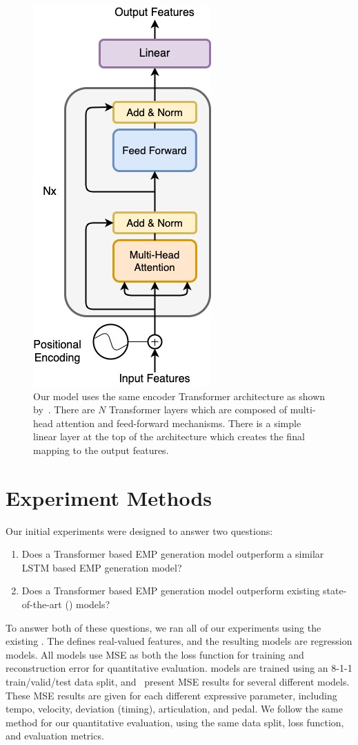 \begin{figure}[h]
    \centering
    \includegraphics[width=0.3\linewidth]{figs/ch5/model_architecture.jpg}
    \caption{Our model uses the same encoder Transformer architecture as shown by~\citet{vaswani2017attention}. There are $N$ Transformer layers which are composed of multi-head attention and feed-forward mechanisms. There is a simple linear layer at the top of the architecture which creates the final mapping to the output features.}
    \label{fig:model_architecture}
\end{figure}

\section{Experiment Methods}\label{sec:experiments-and-evaluation}
Our initial experiments were designed to answer two questions: 
\begin{enumerate}
    \item Does a Transformer based EMP generation model outperform a similar LSTM based EMP generation model?
    \item Does a Transformer based EMP generation model outperform existing state-of-the-art (\vnet{}) models?
\end{enumerate}
To answer both of these questions, we ran all of our experiments using the existing \vnetf{}. The \vnetf{} defines real-valued features, and the resulting models are regression models. All \vnet{} models use MSE as both the loss function for training and reconstruction error for quantitative evaluation. \vnet{} models are trained using an 8-1-1 train/valid/test data split, and~\citet{jeong2019virtuosonet} present MSE results for several different models. These MSE results are given for each different expressive parameter, including tempo, velocity, deviation (timing), articulation, and pedal. We follow the same method for our quantitative evaluation, using the same data split, loss function, and evaluation metrics. 

